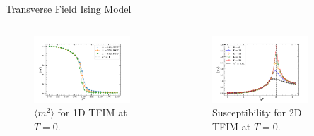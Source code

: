 \documentclass[final,hyperref={pdfpagelabels=false}]{beamer}
\begin{document}
\begin{frame}[t]
\begin{columns}[t]
\begin{column}{.48\textwidth}
\begin{block}{Transverse Field Ising Model}
\begin{columns}[T,onlytextwidth]
\begin{figure}[H]
\centering
\includegraphics[width=0.9\textwidth]{2023-tiwari-espresso-summer-school-poster-session-pimd-main/figures/magnetization_ground_state.pdf}
\caption{$\langle m^2 \rangle$ for 1D TFIM at $T = 0$.}
\end{figure}
\begin{figure}[H]
\centering
\includegraphics[width=0.9\textwidth]{2023-tiwari-espresso-summer-school-poster-session-pimd-main/figures/susceptibility_2d_tfim_zero_temp.pdf}
\caption{Susceptibility for 2D TFIM at $T = 0$.}
\end{figure}
\end{columns}
\end{block}
\end{column} %
\begin{column}{.48\textwidth}


\end{column}
\end{columns}
\end{frame}
\end{document}
